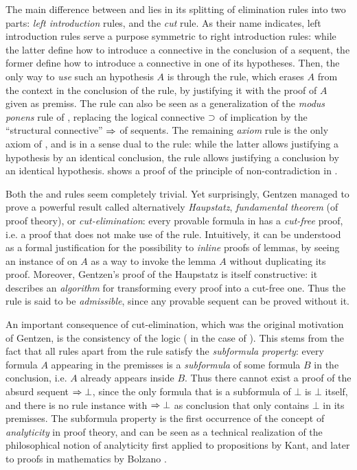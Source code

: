 The main difference between  and  lies in its
splitting of elimination rules into two parts: \emph{left introduction} rules,
and the \emph{cut} rule. As their name indicates, left introduction rules serve
a purpose symmetric to right introduction rules: while the latter define how to
introduce a connective in the conclusion of a sequent, the former define how to
introduce a connective in one of its hypotheses. Then, the only way to
\emph{use} such an hypothesis $A$ is through the  rule, which erases
$A$ from the context in the conclusion of the rule, by justifying it with the
proof of $A$ given as premiss. The  rule can also be seen as a
generalization of the \textit{modus ponens} rule of ,
replacing the logical connective $\supset$ of implication by the ``structural
connective'' $\Rightarrow$ of sequents. The remaining \emph{axiom} rule  is the
only axiom of , and is in a sense dual to the  rule:
while the latter allows justifying a hypothesis by an identical conclusion, the
 rule allows justifying a conclusion by an identical hypothesis.
 shows a proof of the principle of non-contradiction in .

Both the  and  rules seem completely trivial. Yet surprisingly,
Gentzen managed to prove a powerful result called alternatively
\textit{Haupstatz}, \emph{fundamental theorem} (of proof theory), or
\emph{cut-elimination}: every provable formula in  has a
\emph{cut-free} proof, i.e. a proof that does not make use of the 
rule. Intuitively, it can be understood as a formal justification for the
possibility to \emph{inline} proofs of lemmas, by seeing an instance of
 on $A$ as a way to invoke the lemma $A$ without duplicating its proof.
Moreover, Gentzen's proof of the Haupstatz is itself constructive: it describes
an \emph{algorithm} for transforming every  proof into a
cut-free one. Thus the  rule is said to be \emph{admissible}, since any
provable sequent can be proved without it.

An important consequence of cut-elimination, which was the original motivation
of Gentzen, is the consistency of the logic (  in
the case of ). This stems from the fact that all rules apart from the
 rule satisfy the \emph{subformula property}: every formula $A$
appearing in the premisses is a \emph{subformula} of some formula $B$ in the
conclusion, i.e. $A$ already appears inside $B$. Thus there cannot exist a proof
of the absurd sequent $\Rightarrow \bot$, since the only formula that is a subformula
of $\bot$ is $\bot$ itself, and there is no rule instance with $\Rightarrow \bot$ as
conclusion that only contains $\bot$ in its premisses. The subformula property
is the first occurrence of the concept of \emph{analyticity} in proof theory,
and can be seen as a technical realization of the philosophical notion of
analyticity first applied to propositions by Kant, and later to proofs in
mathematics by Bolzano .

